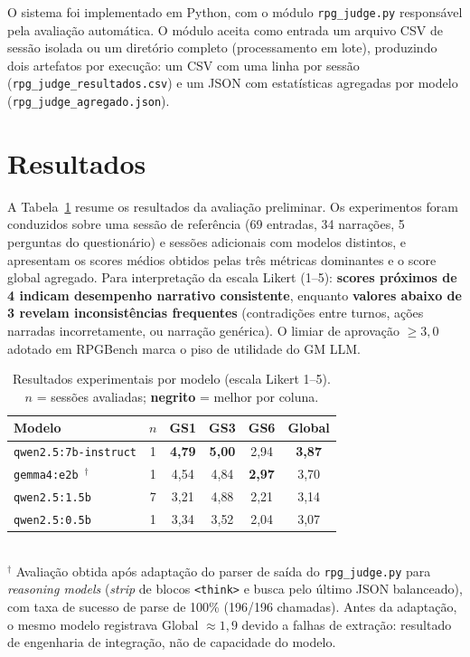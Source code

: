 \documentclass[12pt]{article}
\begin{document}
O sistema foi implementado em Python, com o módulo \texttt{rpg\_judge.py} responsável pela avaliação automática. O módulo aceita como entrada um arquivo CSV de sessão isolada ou um diretório completo (processamento em lote), produzindo dois artefatos por execução: um CSV com uma linha por sessão (\texttt{rpg\_judge\_resultados.csv}) e um JSON com estatísticas agregadas por modelo (\texttt{rpg\_judge\_agregado.json}).

\section{Resultados}
\label{sec:resultados}

A Tabela~\ref{tab:resultados} resume os resultados da avaliação preliminar. Os experimentos foram conduzidos sobre uma sessão de referência (69 entradas, 34 narrações, 5 perguntas do questionário) e sessões adicionais com modelos distintos, e apresentam os scores médios obtidos pelas três métricas dominantes e o score global agregado. Para interpretação da escala Likert (1--5): \textbf{scores próximos de 4 indicam desempenho narrativo consistente}, enquanto \textbf{valores abaixo de 3 revelam inconsistências frequentes} (contradições entre turnos, ações narradas incorretamente, ou narração genérica). O limiar de aprovação $\geq 3{,}0$ adotado em RPGBench \cite{yu:2025} marca o piso de utilidade do GM LLM.

\begin{table}[ht]
\centering
\caption{Resultados experimentais por modelo (escala Likert 1--5). $n$ = sessões avaliadas; \textbf{negrito} = melhor por coluna.}
\label{tab:resultados}
\small
\begin{tabular}{lccccc}
\toprule
\textbf{Modelo} & $n$ & \textbf{GS1} & \textbf{GS3} & \textbf{GS6} & \textbf{Global} \\
\midrule
\texttt{qwen2.5:7b-instruct}                           & 1 & \textbf{4{,}79} & \textbf{5{,}00} & 2{,}94          & \textbf{3{,}87} \\
\texttt{gemma4:e2b}~$^{\dagger}$ \cite{deepmind:gemma4:2026} & 1 & 4{,}54          & 4{,}84          & \textbf{2{,}97} & 3{,}70          \\
\texttt{qwen2.5:1.5b}                                  & 7 & 3{,}21          & 4{,}88          & 2{,}21          & 3{,}14          \\
\texttt{qwen2.5:0.5b}                                  & 1 & 3{,}34          & 3{,}52          & 2{,}04          & 3{,}07          \\
\bottomrule
\end{tabular}
\\[2pt]
{\footnotesize $^{\dagger}$ Avaliação obtida após adaptação do parser de saída do \texttt{rpg\_judge.py} para \textit{reasoning models} (\textit{strip} de blocos \texttt{<think>} e busca pelo último JSON balanceado), com taxa de sucesso de parse de 100\% (196/196 chamadas). Antes da adaptação, o mesmo modelo registrava Global $\approx 1{,}9$ devido a falhas de extração: resultado de engenharia de integração, não de capacidade do modelo.}
\end{table}
\end{document}

